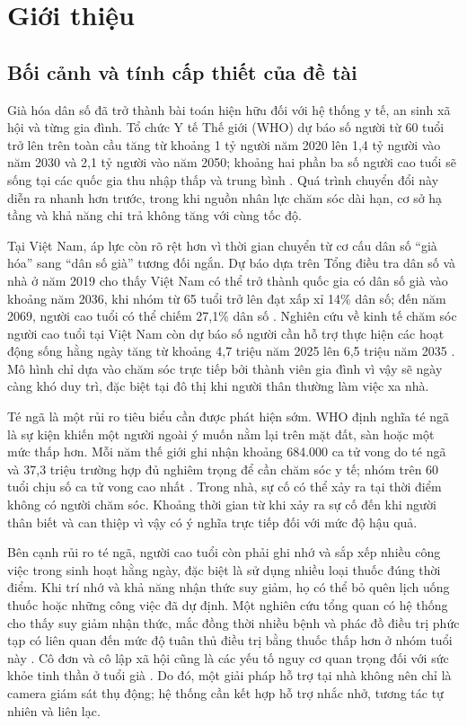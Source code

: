 \section{Giới thiệu}

\subsection{Bối cảnh và tính cấp thiết của đề tài}

Già hóa dân số đã trở thành bài toán hiện hữu đối với hệ thống y tế, an sinh xã hội và từng gia đình. Tổ chức Y tế Thế giới (WHO) dự báo số người từ 60 tuổi trở lên trên toàn cầu tăng từ khoảng 1 tỷ người năm 2020 lên 1,4 tỷ người vào năm 2030 và 2,1 tỷ người vào năm 2050; khoảng hai phần ba số người cao tuổi sẽ sống tại các quốc gia thu nhập thấp và trung bình . Quá trình chuyển đổi này diễn ra nhanh hơn trước, trong khi nguồn nhân lực chăm sóc dài hạn, cơ sở hạ tầng và khả năng chi trả không tăng với cùng tốc độ.

Tại Việt Nam, áp lực còn rõ rệt hơn vì thời gian chuyển từ cơ cấu dân số ``già hóa'' sang ``dân số già'' tương đối ngắn. Dự báo dựa trên Tổng điều tra dân số và nhà ở năm 2019 cho thấy Việt Nam có thể trở thành quốc gia có dân số già vào khoảng năm 2036, khi nhóm từ 65 tuổi trở lên đạt xấp xỉ 14\% dân số; đến năm 2069, người cao tuổi có thể chiếm 27,1\% dân số . Nghiên cứu về kinh tế chăm sóc người cao tuổi tại Việt Nam còn dự báo số người cần hỗ trợ thực hiện các hoạt động sống hằng ngày tăng từ khoảng 4,7 triệu năm 2025 lên 6,5 triệu năm 2035 . Mô hình chỉ dựa vào chăm sóc trực tiếp bởi thành viên gia đình vì vậy sẽ ngày càng khó duy trì, đặc biệt tại đô thị khi người thân thường làm việc xa nhà.

Té ngã là một rủi ro tiêu biểu cần được phát hiện sớm. WHO định nghĩa té ngã là sự kiện khiến một người ngoài ý muốn nằm lại trên mặt đất, sàn hoặc một mức thấp hơn. Mỗi năm thế giới ghi nhận khoảng 684.000 ca tử vong do té ngã và 37,3 triệu trường hợp đủ nghiêm trọng để cần chăm sóc y tế; nhóm trên 60 tuổi chịu số ca tử vong cao nhất . Trong nhà, sự cố có thể xảy ra tại thời điểm không có người chăm sóc. Khoảng thời gian từ khi xảy ra sự cố đến khi người thân biết và can thiệp vì vậy có ý nghĩa trực tiếp đối với mức độ hậu quả.

Bên cạnh rủi ro té ngã, người cao tuổi còn phải ghi nhớ và sắp xếp nhiều công việc trong sinh hoạt hằng ngày, đặc biệt là sử dụng nhiều loại thuốc đúng thời điểm. Khi trí nhớ và khả năng nhận thức suy giảm, họ có thể bỏ quên lịch uống thuốc hoặc những công việc đã dự định. Một nghiên cứu tổng quan có hệ thống cho thấy suy giảm nhận thức, mắc đồng thời nhiều bệnh và phác đồ điều trị phức tạp có liên quan đến mức độ tuân thủ điều trị bằng thuốc thấp hơn ở nhóm tuổi này . Cô đơn và cô lập xã hội cũng là các yếu tố nguy cơ quan trọng đối với sức khỏe tinh thần ở tuổi già . Do đó, một giải pháp hỗ trợ tại nhà không nên chỉ là camera giám sát thụ động; hệ thống cần kết hợp hỗ trợ nhắc nhở, tương tác tự nhiên và liên lạc.

